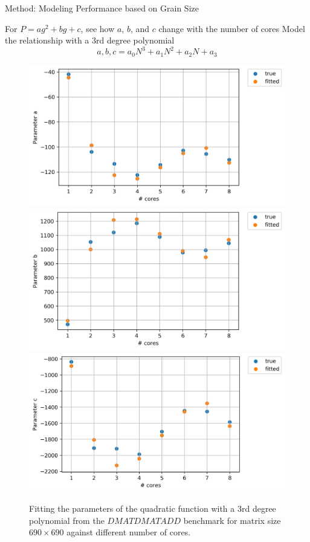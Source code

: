 \documentclass[10pt]{beamer}
\begin{document}
\begin{frame}{Method: Modeling Performance based on Grain Size}
	\begin{outline}	
		\1For $P=ag^2+bg+c$, see how $a$, $b$, and $c$ change with the number of cores
		\1Model the relationship with a 3rd degree polynomial
		$$a,b,c=a_0N^3+a_1N^2+a_2N+a_3$$
		\begin{figure}[H]
			\centering
			{\includegraphics[scale=.2]{images/polyfit/fig_690_params_0.png}\label{fig15:a}}
			{\includegraphics[scale=.2]{images/polyfit/fig_690_params_1.png}\label{fig15:b}}
			{\includegraphics[scale=.2]{images/polyfit/fig_690_params_2.png}\label{fig15:c}}
			\caption{Fitting the parameters of the quadratic function with a $3$rd degree polynomial from the $DMATDMATADD$ benchmark for matrix size $690\times690$ against different number of cores.}	
			\label{fig15}
		\end{figure}
	\end{outline}
\end{frame}
\end{document}
